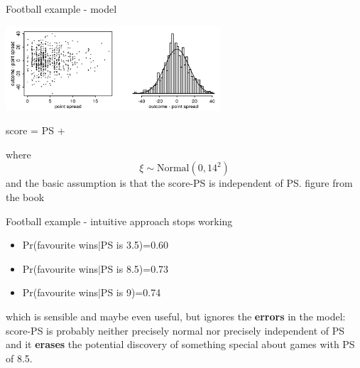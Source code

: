 \documentclass{beamer}
\newcommand{\cor}{\color{reddish}{}}
\newcommand{\cob}{\color{black}{}}
\begin{document}
\begin{frame}{Football example - model}

\begin{center}
    \includegraphics[width=8cm]{football_noise.png}
\end{center}
\cor
\begin{center} score = PS + \xi\end{center}
  \cob{}where\cor
  $$\xi\sim \mbox{Normal}(0,14^2)$$
  \cob
  and the basic assumption is that the \cor{}score-PS\cob{} is independent of  \cor{}PS\cob.
  \vfill
\color{gray}figure from the book\cob
\end{frame}


\begin{frame}{Football example - intuitive approach stops working}
 
  \begin{itemize}
  \item \cor{}Pr(favourite wins$|$PS is 3.5)=0.60\cob
  \item \cor{}Pr(favourite wins$|$PS is 8.5)=0.73\cob
  \item \cor{}Pr(favourite wins$|$PS is 9)=0.74\cob
  \end{itemize}
  \vskip 0.75cm
  which is sensible and maybe even useful, but ignores the
\textbf{errors} in the model: \cor{}score-PS\cob{} is probably neither
precisely normal nor precisely independent of \cor{}PS\cob{} and it
\textbf{erases} the potential discovery of something special about
games with PS of 8.5.
\end{frame}
\end{document}

